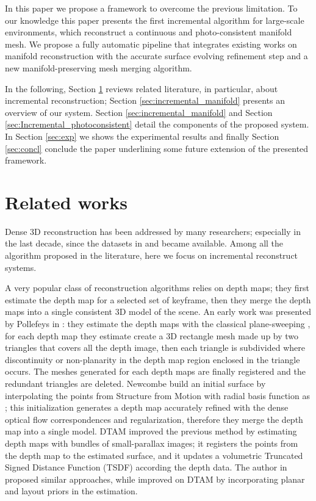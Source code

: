 In this paper we propose a framework to overcome the previous limitation.
To our knowledge this paper presents the first incremental algorithm for large-scale environments, which reconstruct a continuous and photo-consistent manifold mesh. 
We propose a fully automatic pipeline that integrates existing works on manifold reconstruction with the accurate surface evolving refinement step and a new manifold-preserving mesh merging algorithm.

In the following, Section \ref{sec:related_works} reviews related literature, in particular, about incremental reconstruction; Section \ref{sec:incremental_manifold}  presents an overview of our system. Section \ref{sec:incremental_manifold} and Section \ref{sec:Incremental_photoconsistent} detail the components of the proposed system. 
In Section \ref{sec:exp} we shows the experimental results and finally Section \ref{sec:concl} conclude the paper underlining some future extension of the presented framework.

\section{Related works}
\label{sec:related_works}
Dense 3D reconstruction has been addressed by many researchers; especially in the last decade, since the datasets in \cite{seitz_et_al06} and \cite{strecha2008} became available. Among all the algorithm proposed in the literature, here we focus on incremental reconstruct systems. 

A very popular class of reconstruction algorithms relies on depth maps; they first estimate the depth map for a selected set of keyframe, then they merge the depth maps into a single consistent 3D model of the scene. 
An early work was presented by Pollefeys \etal in \cite{pollefeys_et_al_08}: they estimate the depth maps with the classical plane-sweeping \cite{collins1996space}, for each depth map they estimate create a 3D rectangle mesh made up by two triangles that covers all the depth image, then each triangle is subdivided where discontinuity or non-planarity in the depth map region enclosed in the triangle occurs. The meshes generated for each depth maps are finally registered and the redundant triangles are deleted.
Newcombe \etal \cite{newcombe2010live} build an initial surface by interpolating the points from Structure from Motion with radial basis function as \cite{ohtake2003multi}; this initialization generates a depth map accurately refined with the dense optical flow correspondences and regularization, therefore they merge the depth map into a single model.
DTAM \cite{newcombe2011dtam} improved the previous method by estimating depth maps with bundles of small-parallax images; it registers the points from the depth map to the estimated surface, and it updates a volumetric Truncated Signed Distance Function (TSDF) according the depth data. 
The author in \cite{stuhmer2012parallel,stuckler2014multi} proposed similar approaches, while \cite{concha2015incorporating} improved on DTAM by incorporating planar and layout priors in the estimation. 



